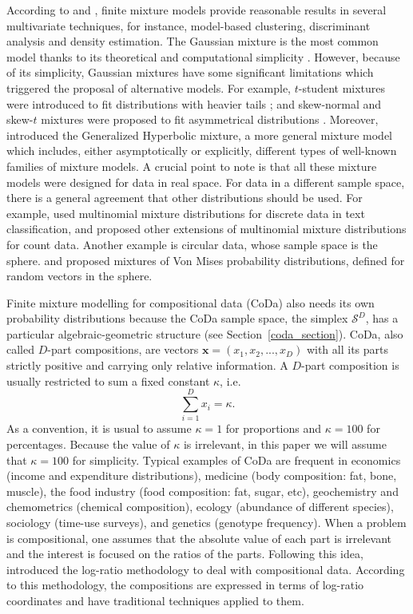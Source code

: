 \documentclass[12pt, a4paper]{article}
\begin{document}
According to \cite{scott1971clustering} and \cite{mclachlan2000finite}, finite mixture models provide reasonable results in several multivariate techniques, for instance, model-based clustering, discriminant analysis and density estimation. The Gaussian mixture is the most common model thanks to its theoretical and computational simplicity \citep{mclachlan2000finite}. 
However, because of its simplicity, Gaussian mixtures have some significant limitations 
which triggered the proposal of alternative models. For example, $t$-student mixtures were introduced to fit distributions with heavier tails \citep{andrews2012model, lee2013finite, lin2010robust}; and skew-normal and skew-$t$ mixtures were proposed to fit asymmetrical distributions \citep{lee2011fitting}. Moreover, \cite{browne2013mixture} introduced the Generalized Hyperbolic mixture, a more general mixture model which includes, either asymptotically or explicitly, different types of well-known families of mixture models. A crucial point to note is that all these mixture models were designed for data in real space. For data in a different sample space, there is a general agreement that other distributions should be used. 
For example, \cite{bickel2004multi} used multinomial mixture distributions for discrete data in text classification, and  
 \cite{bouguila2011count} proposed other extensions of multinomial mixture distributions for count data. 
Another example is circular data, whose sample space is the sphere.  \cite{banerjee2005clustering} and \cite{mardia2007protein} proposed mixtures of Von Mises probability distributions, defined for random vectors in the sphere.

Finite mixture modelling for compositional data (CoDa) also needs its own probability distributions because the CoDa sample space, the simplex $\mathcal{S}^D$, has a particular algebraic-geometric structure (see Section~\ref{coda_section}).
CoDa, also called $D$-part compositions, are vectors $\textbf{x} = (x_1, x_2, ..., x_D)$ with all its parts strictly positive  and carrying only relative information. A $D$-part composition is usually restricted to sum a fixed constant $\kappa$, i.e.
\begin{equation}
\sum_{i=1 }^D x_i = \kappa.
\label{sum_to_constant}
\end{equation}
As a convention, it is usual to assume $\kappa =1$ for proportions and $\kappa = 100$ for percentages. Because the value of $\kappa$ is irrelevant, in this paper we will assume that $\kappa = 100$ for simplicity. Typical examples of CoDa are frequent in economics (income and expenditure distributions), medicine (body composition: fat, bone, muscle), the food industry (food composition: fat, sugar, etc), geochemistry and chemometrics (chemical composition), ecology (abundance of different species), sociology (time-use surveys), and genetics (genotype frequency). 
When a problem is compositional, one assumes that the absolute value of each part is irrelevant and the interest is focused on the ratios of the parts. Following this idea, \cite{aitchison1986statistical} introduced the log-ratio methodology to deal with compositional data. According to this methodology, the compositions are expressed in terms of log-ratio coordinates and have traditional techniques applied to them.
\end{document}
